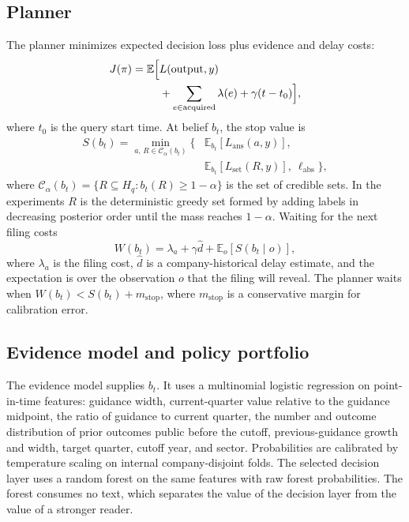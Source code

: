 \documentclass[11pt]{article}
\newcommand{\E}{\mathbb{E}}
\begin{document}
\subsection{Planner}
The planner minimizes expected decision loss plus evidence and delay costs:
\begin{equation}
\begin{split}
J(\pi)=\E\Bigl[&L(\text{output},y)\\
&+\sum_{e\in\text{acquired}}\lambda(e)+\gamma(t-t_0)\Bigr],
\end{split}
\label{eq:objective}
\end{equation}
where $t_0$ is the query start time. At belief $b_t$, the stop value is
\begin{equation}
\begin{split}
S(b_t)=\min_{a,\,R\in\mathcal C_\alpha(b_t)}\bigl\{&
\E_{b_t}[L_{\text{ans}}(a,y)],\\
&\E_{b_t}[L_{\text{set}}(R,y)],\ \ell_{\text{abs}}\bigr\},
\end{split}
\label{eq:stop}
\end{equation}
where $\mathcal C_\alpha(b_t)=\{R\subseteq H_q: b_t(R)\ge 1-\alpha\}$ is the set of credible sets. In the experiments $R$ is the deterministic greedy set formed by adding labels in decreasing posterior order until the mass reaches $1-\alpha$. Waiting for the next filing costs
\begin{equation}
W(b_t)=\lambda_a+\gamma\hat d+\E_{o}\left[S(b_t\mid o)\right],
\label{eq:wait}
\end{equation}
where $\lambda_a$ is the filing cost, $\hat d$ is a company-historical delay estimate, and the expectation is over the observation $o$ that the filing will reveal. The planner waits when $W(b_t)<S(b_t)+m_{\text{stop}}$, where $m_{\text{stop}}$ is a conservative margin for calibration error.

\subsection{Evidence model and policy portfolio}
The evidence model supplies $b_t$. It uses a multinomial logistic regression on point-in-time features: guidance width, current-quarter value relative to the guidance midpoint, the ratio of guidance to current quarter, the number and outcome distribution of prior outcomes public before the cutoff, previous-guidance growth and width, target quarter, cutoff year, and sector. Probabilities are calibrated by temperature scaling on internal company-disjoint folds. The selected decision layer uses a random forest on the same features with raw forest probabilities. The forest consumes no text, which separates the value of the decision layer from the value of a stronger reader.
\end{document}
